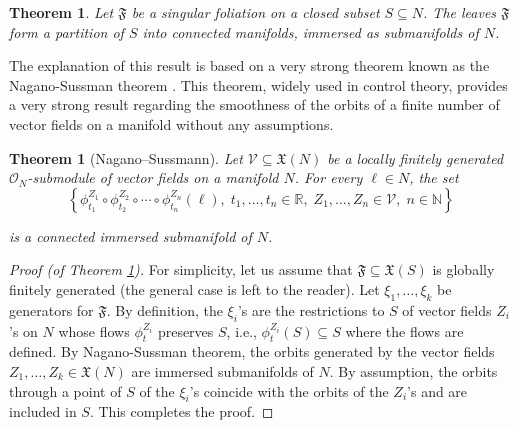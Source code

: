 \documentclass[10pt]{article}
\theoremstyle{plain}
\newtheorem{theorem}[lemma]{Theorem}
\theoremstyle{definition}
\theoremstyle{remark}
\begin{document}
\begin{theorem}\label{thm:Sussmann_SP}Let $\mathfrak{F}$ be a singular foliation on a closed subset  $S\subseteq N$. The leaves $\mathfrak F$ form a partition of $S$ into connected manifolds,  immersed as submanifolds of $N$.
\end{theorem}
The explanation of this result is based on a very strong theorem known as the Nagano-Sussman theorem \cite{Nagano}. This theorem, widely used in control theory, provides a very strong result regarding the smoothness of the orbits of a finite number of vector fields on a manifold  without any assumptions. 
       \begin{theorem}[Nagano–Sussmann] Let $\mathcal{V}\subseteq \mathfrak X(N)$ be a locally finitely generated $\mathcal{O}_N$-submodule of vector fields on a manifold $N$. For every $\ell\in N$, the set
       $$\left\{\phi_{t_1}^{Z_1}\circ \phi_{t_2}^{Z_2}\circ \cdots \circ \phi_{t_n}^{Z_n}(\ell),\; t_1, \ldots, t_n\in \mathbb R,\; Z_1,\ldots, Z_n\in \mathcal{V},\;n\in \mathbb N\right\}$$
       
       
     is a connected immersed submanifold of $N$.
       \end{theorem}
      


\begin{proof}[Proof (of Theorem \ref{thm:Sussmann_SP})]

   For simplicity, let us assume that $\mathfrak{F}\subseteq \mathfrak X(S)$ is globally finitely generated (the general case is left to the reader). Let $\xi_1,\ldots, \xi_k$ be generators for $\mathfrak F$. By definition, the $\xi_i$'s are the restrictions to $S$ of vector fields $Z_i$'s on $N$ whose flows $\phi^{Z_i}_t$ preserves $S$, i.e.,   $\phi^{Z_i}_t(S)\subseteq S$ where the flows are defined. By Nagano-Sussman theorem, the orbits generated by the vector fields  $Z_1,\ldots, Z_k\in \mathfrak X(N)$  are immersed submanifolds of $N$. By assumption, the orbits through a point of $S$ of the $\xi_i$'s coincide with the orbits of the $Z_i$'s %
   and are included in $S$. This completes the proof.
\end{proof}
\end{document}
